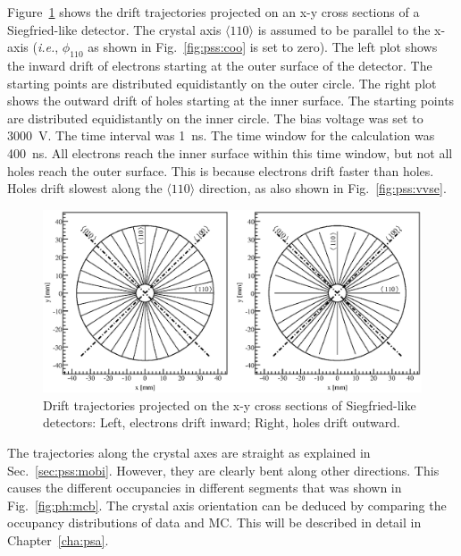 Figure~\ref{fig:pss:trjs} shows the drift trajectories projected on an
x-y cross sections of a Siegfried-like detector.  The crystal axis
$\langle 110 \rangle$ is assumed to be parallel to the x-axis
(\textit{i.e.}, $\phi_{110}$ as shown in Fig.~\ref{fig:pss:coo} is set
to zero). The left plot shows the inward drift of electrons starting
at the outer surface of the detector. The starting points are
distributed equidistantly on the outer circle.  The right plot shows
the outward drift of holes starting at the inner surface.  The
starting points are distributed equidistantly on the inner circle.
The bias voltage was set to 3000~V. The time interval was 1~ns.  The
time window for the calculation was 400~ns.  All electrons reach the
inner surface within this time window, but not all holes reach the
outer surface.  This is because electrons drift faster than holes.
Holes drift slowest along the $\langle 110 \rangle$ direction, as also
shown in Fig.~\ref{fig:pss:vvse}.
\begin{figure}[tbhp] 
\centering 
\includegraphics[width=\textwidth]{trjs} 
\caption{Drift trajectories projected on the x-y cross sections of
Siegfried-like detectors: Left, electrons drift inward; Right, holes
drift outward.}
\label{fig:pss:trjs} 
\end{figure} 
 
The trajectories along the crystal axes are straight as explained in
Sec.~\ref{sec:pss:mobi}.  However, they are clearly bent along other
directions.  This causes the different occupancies in different
segments that was shown in Fig.~\ref{fig:ph:mcb}.  The crystal axis
orientation can be deduced by comparing the occupancy distributions of
data and MC.  This will be described in detail in
Chapter~\ref{cha:psa}.
 
 
